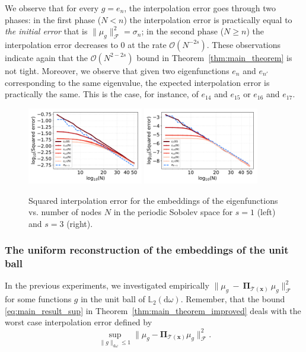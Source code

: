 \documentclass[twoside,11pt]{book}
\numberwithin{theorem}{chapter}
\numberwithin{definition}{chapter}
\numberwithin{proposition}{chapter}
\numberwithin{corollary}{chapter}
\numberwithin{example}{chapter}
\numberwithin{lemma}{chapter}
\numberwithin{assumption}{chapter}
\numberwithin{equation}{chapter}
\numberwithin{figure}{chapter}
\begin{document}
 We observe that for every $g = e_{n}$, the interpolation error goes through two phases: in the first phase ($N < n$) the interpolation error is practically equal to \emph{the initial error} that is $\|\mu_{g}\|_{\mathcal{F}}^{2} = \sigma_{n}$; in the second phase ($N \geq n$) the interpolation error decreases to $0$ at the rate $\mathcal{O}(N^{-2s})$. These observations indicate again that the $\mathcal{O}(N^{2-2s})$ bound in Theorem~\ref{thm:main_theorem} is not tight.
 Moreover, we observe that given two eigenfunctions $e_{n}$ and $e_{n'}$ corresponding to the same eigenvalue, the expected interpolation error is practically the same. This is the case, for instance, of $e_{14}$ and $e_{15}$ or $e_{16}$ and $e_{17}$.
\begin{figure}
\centering
\includegraphics[width=0.45\textwidth]{img/neurips/Sobolev/multig_interpolation_pSobolev_s_1_fig_1.pdf}
\includegraphics[width=0.45\textwidth]{img/neurips/Sobolev/multig_interpolation_pSobolev_s_3_fig_1.pdf}\\
\caption{Squared interpolation error for the embeddings of the eigenfunctions vs. number of nodes $N$ in the periodic Sobolev space for $s = 1$ (left) and $s=3$ (right).
\label{fig:pDPP_results_pSobolev_exp_2}}
\end{figure}
\subsubsection{The uniform reconstruction of the embeddings of the unit ball}



In the previous experiments, we investigated empirically $\|\mu_{g}~-~\bm{\Pi}_{\mathcal{T}(\bm{x})}~\mu_{g}\|_{\mathcal{F}}^{2}$ for some functions $g$ in the unit ball of $\mathbb{L}_{2}(\mathrm{d}\omega)$. Remember, that the bound \eqref{eq:main_result_sup} in Theorem~\ref{thm:main_theorem_improved} deals with the worst case interpolation error defined by
\begin{equation}\label{eq:worst_interpolation_error_supunitball}
\sup\limits_{\|g\|_{\mathrm{d}\omega} \leq 1} \|\mu_{g}-\bm{\Pi}_{\mathcal{T}(\bm{x})} \mu_{g}\|_{\mathcal{F}}^{2}.
\end{equation}
\end{document}
